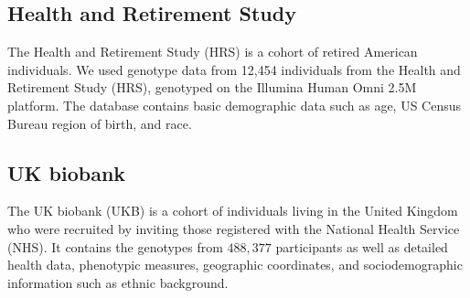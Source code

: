 \subsection{Health and Retirement Study}

The Health and Retirement Study (HRS) is a cohort of retired American individuals\citep{juster_overview_1995}. We used genotype data from 12,454 individuals from the Health and Retirement Study (HRS), genotyped on the Illumina Human Omni 2.5M platform. The database contains basic demographic data such as age, US Census Bureau region of birth, and race.

\subsection{UK biobank}

The UK biobank (UKB) is a cohort of individuals living in the United Kingdom who were recruited by inviting those registered with the National Health Service (NHS)\citep{sudlow_uk_2015}. It contains the genotypes from $488,377$ participants as well as detailed health data, phenotypic measures, geographic coordinates, and sociodemographic information such as ethnic background.





